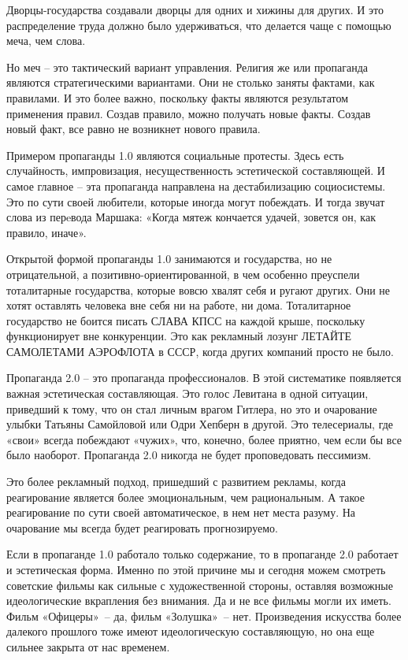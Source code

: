 Дворцы-государства создавали дворцы для одних и хижины для других. И это
распределение труда должно было удерживаться, что делается чаще с помощью меча,
чем слова.

Но меч – это тактический вариант управления. Религия же или пропаганда являются
стратегическими вариантами. Они не столько заняты фактами, как правилами. И это
более важно, поскольку факты являются результатом применения правил. Создав
правило, можно получать новые факты. Создав новый факт, все равно не возникнет
нового правила.

Примером пропаганды 1.0 являются социальные протесты. Здесь есть случайность,
импровизация, несущественность эстетической составляющей. И самое главное – эта
пропаганда направлена на дестабилизацию социосистемы. Это по сути своей
любители, которые иногда могут побеждать. И тогда звучат слова из перeвода
Маршака: «Когда мятеж кончается удачей, зовется он, как правило, иначе».

Открытой формой пропаганды 1.0 занимаются и государства, но не отрицательной, а
позитивно-ориентированной, в чем особенно преуспели тоталитарные государства,
которые вовсю хвалят себя и ругают других. Они не хотят оставлять человека вне
себя ни на работе, ни дома. Тоталитарное государство не боится писать СЛАВА
КПСС на каждой крыше, поскольку функционирует вне конкуренции. Это как
рекламный лозунг ЛЕТАЙТЕ САМОЛЕТАМИ АЭРОФЛОТА в СССР, когда других компаний
просто не было.

Пропаганда 2.0 – это пропаганда профессионалов. В этой систематике появляется
важная эстетическая составляющая. Это голос Левитана в одной ситуации,
приведший к тому, что он стал личным врагом Гитлера, но это и очарование улыбки
Татьяны Самойловой или Одри Хепберн в другой. Это телесериалы, где «свои»
всегда побеждают «чужих», что, конечно, более приятно, чем если бы все было
наоборот. Пропаганда 2.0 никогда не будет проповедовать пессимизм.

Это более рекламный подход, пришедший с развитием рекламы, когда реагирование
является более эмоциональным, чем рациональным. А такое реагирование по сути
своей автоматическое, в нем нет места разуму. На очарование мы всегда будет
реагировать прогнозируемо.

Если в пропаганде 1.0 работало только содержание, то в пропаганде 2.0 работает
и эстетическая форма. Именно по этой причине мы и сегодня можем смотреть
советские фильмы как сильные с художественной стороны, оставляя возможные
идеологические вкрапления без внимания. Да и не все фильмы могли их иметь.
Фильм «Офицеры» – да, фильм «Золушка» – нет. Произведения искусства более
далекого прошлого тоже имеют идеологическую составляющую, но она еще сильнее
закрыта от нас временем.

